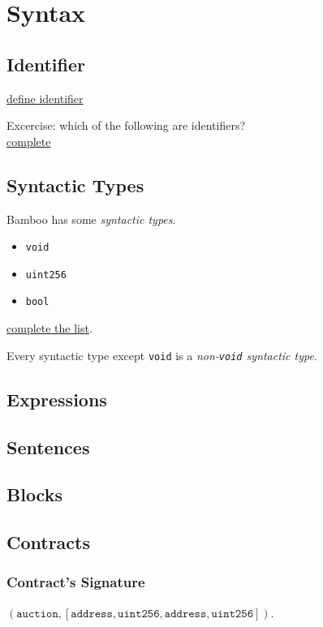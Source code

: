 \documentclass{book}
\newcommand{\todo}[1]{\underline{#1}}
\begin{document}
\chapter{Syntax}

\section{Identifier}

\todo{define identifier}

Excercise: which of the following are identifiers? \\
\todo{complete}

\section{Syntactic Types}

Bamboo has some \textit{syntactic types}.
\begin{itemize}
\item \texttt{void}
\item \texttt{uint256}
\item \texttt{bool}
\end{itemize}
\todo{complete the list}.

Every syntactic type except \texttt{void} is a \textit{non-\texttt{void} syntactic type}.

\section{Expressions}

\section{Sentences}

\section{Blocks}

\section{Contracts}

\subsection{Contract's Signature}

$(\mathtt{auction}, [\mathtt{address}, \mathtt{uint256}, \mathtt{address}, \mathtt{uint256}])$.
\end{document}
